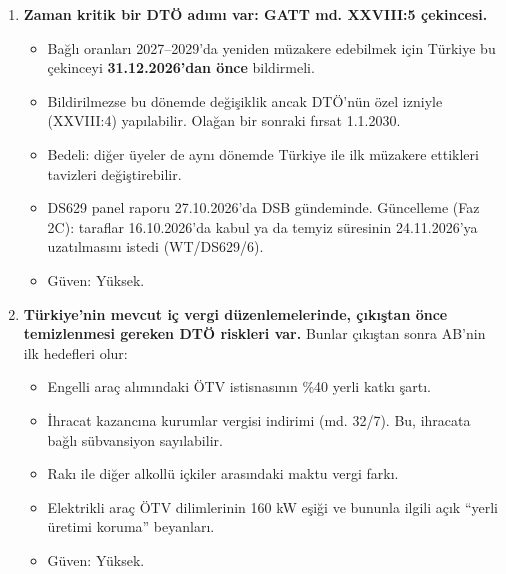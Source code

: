 \begin{enumerate}
  \begin{itemize}
  \tightlist
  \item
    1.1.2028 için gerçekçi olan yalnızca çıkış kararı ve dondurma (geçiş dönemi). Ortaklık Konseyi kararı GB'yi kaldıramaz; GB'nin hukuken sona ermesi ITA'nın yürürlüğüyle olur.
  \item
    1.1.2029 için en fazla mal ağırlıklı bir serbest ticaret anlaşması (STA). Bunun için AB müzakere yetkisinin en geç 2027'nin üçüncü çeyreğinde verilmesi gerekir.
  \item
    Derin ve kapsamlı STA (DCFTA) 2030 sonrası bir projedir.
  \item
    \etiketH{} Güven: Orta.
  \end{itemize}
\item
  \textbf{Zaman kritik bir DTÖ adımı var: GATT md. XXVIII:5 çekincesi.}

  \begin{itemize}
  \tightlist
  \item
    Bağlı oranları 2027--2029'da yeniden müzakere edebilmek için Türkiye bu çekinceyi \textbf{31.12.2026'dan önce} bildirmeli.
  \item
    Bildirilmezse bu dönemde değişiklik ancak DTÖ'nün özel izniyle (XXVIII:4) yapılabilir. Olağan bir sonraki fırsat 1.1.2030.
  \item
    Bedeli: diğer üyeler de aynı dönemde Türkiye ile ilk müzakere ettikleri tavizleri değiştirebilir.
  \item
    DS629 panel raporu 27.10.2026'da DSB gündeminde. Güncelleme (Faz 2C): taraflar 16.10.2026'da kabul ya da temyiz süresinin 24.11.2026'ya uzatılmasını istedi (WT/DS629/6).
  \item
    \etiketV{} Güven: Yüksek.
  \end{itemize}
\item
  \textbf{Türkiye'nin mevcut iç vergi düzenlemelerinde, çıkıştan önce temizlenmesi gereken DTÖ riskleri var.} Bunlar çıkıştan sonra AB'nin ilk hedefleri olur:

  \begin{itemize}
  \tightlist
  \item
    Engelli araç alımındaki ÖTV istisnasının \%40 yerli katkı şartı.
  \item
    İhracat kazancına kurumlar vergisi indirimi (md. 32/7). Bu, ihracata bağlı sübvansiyon sayılabilir.
  \item
    Rakı ile diğer alkollü içkiler arasındaki maktu vergi farkı.
  \item
    Elektrikli araç ÖTV dilimlerinin 160 kW eşiği ve bununla ilgili açık ``yerli üretimi koruma'' beyanları.
  \item
    \etiketV{} Güven: Yüksek.
  \end{itemize}
\end{enumerate}

